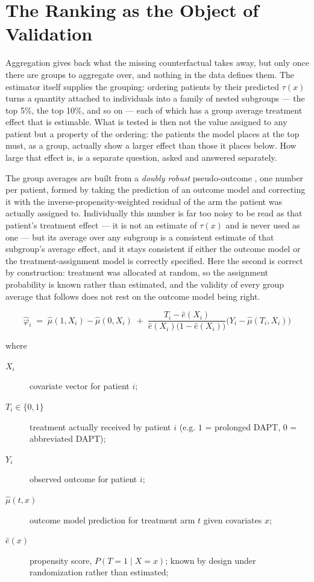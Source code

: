 \section{The Ranking as the Object of Validation}
\label{sec:validation}

Aggregation gives back what the missing counterfactual takes away, but only
once there are groups to aggregate over, and nothing in the data defines
them. The estimator itself supplies the grouping: ordering patients by their
predicted $\tau(x)$ turns a quantity attached to individuals into a family of
nested subgroups — the top 5\%, the top 10\%, and so on — each of which has a
group average treatment effect that is estimable. What is tested is then not
the value assigned to any patient but a property of the ordering: the
patients the model places at the top must, as a group, actually show a larger
effect than those it places below. How large that effect is, is a separate
question, asked and answered separately.

\vspace{10pt}

The group averages are built from a \emph{doubly robust} pseudo-outcome \citep{kennedy2020}, one
number per patient, formed by taking the prediction of an outcome model and
correcting it with the inverse-propensity-weighted residual of the arm the
patient was actually assigned to. Individually this number is far too noisy
to be read as that patient's treatment effect — it is not an estimate of
$\tau(x)$ and is never used as one — but its average over any subgroup is a
consistent estimate of that subgroup's average effect, and it stays
consistent if either the outcome model or the treatment-assignment model is
correctly specified. Here the second is correct by construction: treatment
was allocated at random, so the assignment probability is known rather than
estimated, and the validity of every group average that follows does not rest
on the outcome model being right.

\begin{equation}
\hat{\varphi}_i \;=\; \hat{\mu}(1, X_i) - \hat{\mu}(0, X_i)
\;+\; \frac{T_i - \hat{e}(X_i)}{\hat{e}(X_i)\big(1 - \hat{e}(X_i)\big)}
\Big(Y_i - \hat{\mu}(T_i, X_i)\Big)
\label{eq:aipw-pseudo-outcome}
\end{equation}

\noindent where
\begin{description}
    \item[$X_i$] covariate vector for patient $i$;
    \item[$T_i \in \{0,1\}$] treatment actually received by patient $i$ (e.g. $1$ = prolonged DAPT, $0$ = abbreviated DAPT);
    \item[$Y_i$] observed outcome for patient $i$;
    \item[$\hat{\mu}(t, x)$] outcome model prediction for treatment arm $t$ given covariates $x$;
    \item[$\hat{e}(x)$] propensity score, $P(T=1 \mid X=x)$; known by design under randomization rather than estimated;
\end{description}

